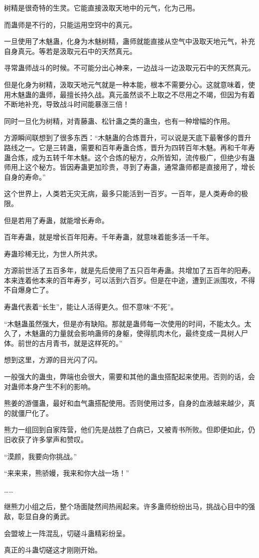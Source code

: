 \begin{this_body}
树精是很奇特的生灵。它能直接汲取天地中的元气，化为己用。

而蛊师是不行的，只能运用空窍中的真元。

一旦使用了木魅蛊，化身为木魅树精，蛊师就能直接从空气中汲取天地元气，补充自身真元。等若是汲取元石中的天然真元。

寻常蛊师战斗的时候。不可能分出心神来，一边战斗一边汲取元石中的天然真元。

但是化身为树精，汲取天地元气就是一种本能，根本不需要分心。这就意味着，使用木魅蛊的蛊师，最擅长持久战。真元虽然谈不上取之不尽用之不竭，但因为有着不断地补充，导致战斗时间能暴涨三倍！

同时一旦化为树精，对青藤蛊、松针蛊之类的蛊虫，也有一种增幅的作用。

方源瞬间联想到了很多东西：“木魅蛊的合炼晋升，可以说是天底下最奢侈的晋升路线之一。它是三转蛊，需要和百年寿蛊合炼，晋升为四转百年木魅。再和千年寿蛊合炼，成为五转千年木魅。这个合炼的秘方，众所皆知，流传极广，但绝少有蛊师用上这个秘方。皆因寿蛊更加珍贵，寻到了寿蛊，通常蛊师都是直接用了，增长自身的寿命。”

这个世界上，人类若无灾无病，最多只能活到一百岁。一百年，是人类寿命的极限。

但是若用了寿蛊，就能增长寿命。

百年寿蛊，就是增长百年阳寿。千年寿蛊，就意味着能多活一千年。

寿蛊珍稀无比，为世人所共求。

方源前世活了五百多年，就是先后使用了五只百年寿蛊。共增加了五百年的阳寿。本来连着他本来的百年寿岁，可以活到六百岁。但是在中途，遭到正派围攻，不得不自爆身亡了。

寿蛊代表着“长生”，能让人活得更久。但不意味“不死”。

“木魅蛊虽然强大，但是亦有缺陷。那就是蛊师每一次使用的时间，不能太久。太久了，木魅蛊的力量就会影响蛊师的身躯，使得肌肉木化，最终变成一具树人尸体。前世的古月青书，就是这样死的。”

想到这里，方源的目光闪了闪。

一般强大的蛊虫，弊端也会很大，需要和其他的蛊虫搭配起来使用。否则的话，会对蛊师本身产生不利的影响。

熊姜的游僵蛊，最好和血气蛊搭配使用。否则使用过多，自身的血液越来越少，真的就僵尸化了。

熊力一组回到自家阵营，他们先是战胜了白病已，又被青书所败。但即便如此，仍旧收获了许多掌声和赞叹。

“漠颜，我要向你挑战。”

“来来来，熊骄嫚，我来和你大战一场！”

……

继熊力小组之后，整个场面陡然间热闹起来。许多蛊师纷纷出马，挑战心目中的强敌，彰显自身的勇武。

会盟坡上一阵混乱，切磋斗蛊精彩纷呈。

真正的斗蛊切磋这才刚刚开始。

\end{this_body}

